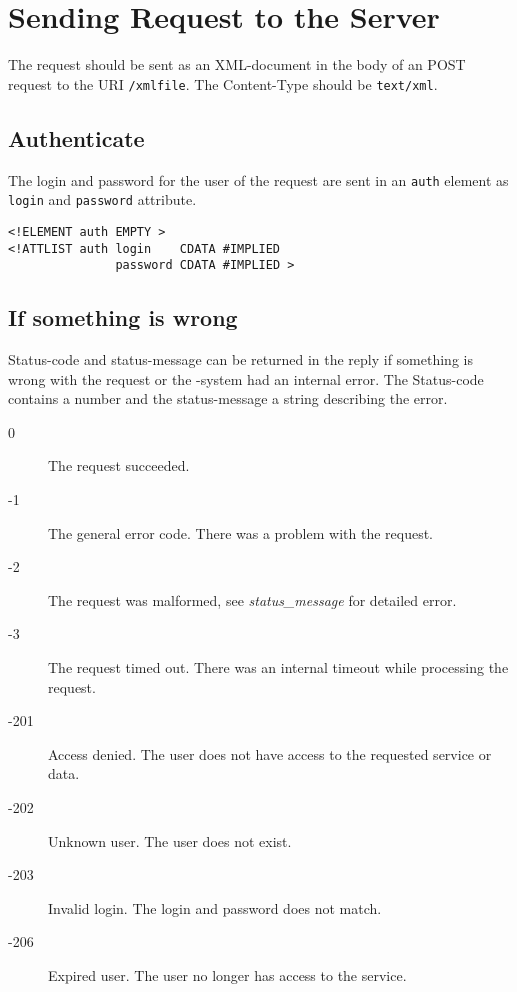 \section{Sending Request to the Server}

The request should be sent as an XML-document in the body of an POST
request to the URI \verb$/xmlfile$. The Content-Type should be 
\texttt{text/xml}.


\subsection{Authenticate}

The login and password for the user of the request are sent in an 
\texttt{auth} element as \texttt{login} and \texttt{password} attribute.

\begin{verbatim}
<!ELEMENT auth EMPTY >
<!ATTLIST auth login    CDATA #IMPLIED 
               password CDATA #IMPLIED >
\end{verbatim}


\subsection{If something is wrong}


Status-code and status-message can be returned in the reply if something 
is wrong with the request or the \mc-system had an internal error. The
Status-code contains a number and the status-message a string describing
the error.

\begin{description}
\item[0] The request succeeded.
\item[-1] The general error code. There was a problem with the request.
\item[-2] The request was malformed, see \emph{status\_message}
          for detailed error.
\item[-3] The request timed out. There was an internal timeout while 
          processing the request.
\item[-201] Access denied. The user does not have access to the requested 
  service or data. 
\item[-202] Unknown user. The user does not exist.
\item[-203] Invalid login. The login and password does not match.
\item[-206] Expired user. The user no longer has access to the service.
\end{description}



